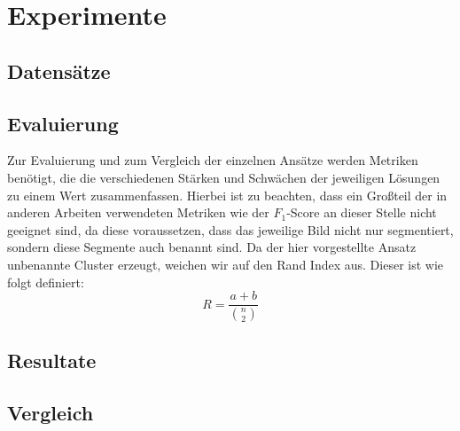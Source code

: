 \chapter{Experimente}
\label{chap:experimente}

\section{Datensätze}
\label{sec:datensätze}

\section{Evaluierung}
\label{sec:evaluierung}

Zur Evaluierung und zum Vergleich der einzelnen Ansätze werden Metriken benötigt, die die verschiedenen Stärken und Schwächen der jeweiligen Lösungen zu einem Wert zusammenfassen. Hierbei ist zu beachten, dass ein Großteil der in anderen Arbeiten verwendeten Metriken wie \bspw der $F_1$-Score an dieser Stelle nicht geeignet sind, da diese voraussetzen, dass das jeweilige Bild nicht nur segmentiert, sondern diese Segmente auch benannt sind. Da der hier vorgestellte Ansatz unbenannte Cluster erzeugt, weichen wir auf den Rand Index\cite{randindex} aus. Dieser ist wie folgt definiert:
\[R=\frac{a+b}{\binom{n}{2}}\]


\section{Resultate}
\label{sec:resultate}

\section{Vergleich}
\label{sec:vergleich}